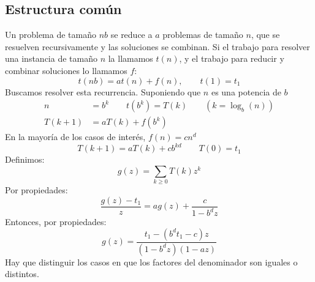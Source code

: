 \documentclass[english, spanish, fleqn, 10pt]{article}
\numberwithin{equation}{section}
\newcommand{\nparentesis}[1]{\left( #1 \right)}
\theoremstyle{definition}
\begin{document}
\subsection{Estructura común}
\label{sec:estructura-comun}

	Un problema de tamaño $nb$ se reduce a $a$ problemas de tamaño $n$, que se resuelven recursivamente y las soluciones se combinan. Si el trabajo para resolver una instancia de tamaño $n$ la llamamos $t\nparentesis{n}$, y el trabajo para reducir y combinar soluciones lo llamamos $f$:
	\begin{equation}
	t\nparentesis{nb}=at\nparentesis{n}+f\nparentesis{n},\qquad t\nparentesis{1}=t_1
	\end{equation}
        Buscamos resolver esta recurrencia.
	Suponiendo que $n$ es una potencia de $b$
	\begin{align*}
	n &= b^k \qquad t\nparentesis{b ^k} = T\nparentesis{k}\qquad\nparentesis{k = \log_b\nparentesis{n}}\\
	T\nparentesis{k + 1} &= a T\nparentesis{k} + f\nparentesis{b^ k}
	\end{align*}
	En la mayoría de los casos de interés, $f\nparentesis{n} = cn^d$
	\begin{equation*}
	T\nparentesis{k + 1} = aT\nparentesis{k} + cb^{kd}\qquad T\nparentesis{0}= t_1
	\end{equation*}
	Definimos:
	\begin{equation*}
	g\nparentesis{z} = \sum_{k \geq 0} T\nparentesis{k} z^k
	\end{equation*}
	Por propiedades:
	\begin{equation*}
	\dfrac{g\nparentesis{z} - t_1}{z} = a g\nparentesis{z} + \dfrac{c}{1 - b^d z}
	\end{equation*}
	Entonces, por propiedades:
	\begin{equation*}
	g\nparentesis{z} = \dfrac{t_1 - \nparentesis{b^d t_1 - c}z}{\nparentesis{1-b^d z}\nparentesis{1-az}}
	\end{equation*}
	Hay que distinguir los casos en que los factores del denominador son iguales o distintos.
	
\end{document}
